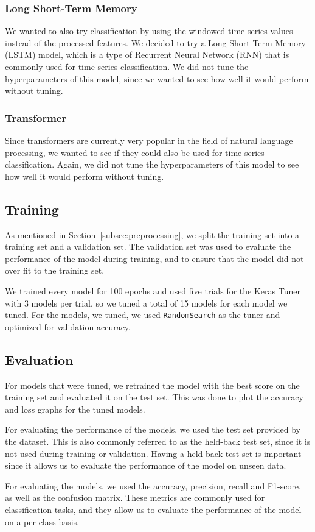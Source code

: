 \subsubsection{Long Short-Term Memory}

We wanted to also try classification by using the windowed time series values instead of the processed features.
We decided to try a Long Short-Term Memory (LSTM) model, which is a type of Recurrent Neural Network (RNN) that is commonly used for time series classification.
We did not tune the hyperparameters of this model, since we wanted to see how well it would perform without tuning.

\subsubsection{Transformer}

Since transformers are currently very popular in the field of natural language processing, we wanted to see if they could also be used for time series classification.
Again, we did not tune the hyperparameters of this model to see how well it would perform without tuning.

\subsection{Training}\label{subsec:training}

As mentioned in Section~\ref{subsec:preprocessing}, we split the training set into a training set and a validation set.
The validation set was used to evaluate the performance of the model during training, and to ensure that the model did not over fit to the training set.

We trained every model for 100 epochs and used five trials for the Keras Tuner with 3 models per trial, so we tuned a total of 15 models for each model we tuned.
For the models, we tuned, we used \texttt{RandomSearch} as the tuner and optimized for validation accuracy.

\subsection{Evaluation}\label{subsec:evaluation}

For models that were tuned, we retrained the model with the best score on the training set and evaluated it on the test set.
This was done to plot the accuracy and loss graphs for the tuned models.

For evaluating the performance of the models, we used the test set provided by the dataset.
This is also commonly referred to as the held-back test set, since it is not used during training or validation.
Having a held-back test set is important since it allows us to evaluate the performance of the model on unseen data.

For evaluating the models, we used the accuracy, precision, recall and F1-score, as well as the confusion matrix.
These metrics are commonly used for classification tasks, and they allow us to evaluate the performance of the model on a per-class basis.